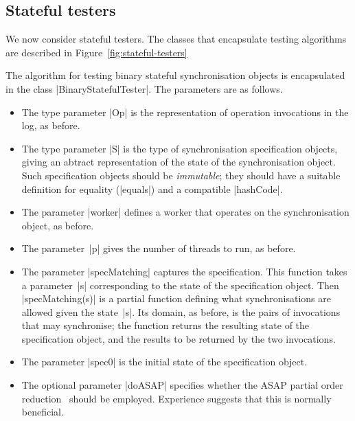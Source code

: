 \subsection{Stateful testers}

We now consider stateful testers.  The classes that encapsulate testing
algorithms are described in Figure~\ref{fig:stateful-testers}

The algorithm for testing binary stateful synchronisation objects is
encapsulated in the class |BinaryStatefulTester|.  The parameters are as
follows.
%
\begin{itemize}
\item The type parameter |Op| is the representation of operation invocations
  in the log, as before.

\item The type parameter |S| is the type of synchronisation specification
  objects, giving an abtract representation of the state of the
  synchronisation object.  Such specification objects should be
  \emph{immutable}; they should have a suitable definition for equality
  (|equals|) and a compatible |hashCode|.

\item The parameter |worker| defines a worker that operates on the
  synchronisation object, as before.

\item The parameter~|p| gives the number of threads to run, as before.

\item The parameter |specMatching| captures the specification.  This function
  takes a parameter~|s| corresponding to the state of the specification
  object.  Then |specMatching(s)| is a partial function defining what
  synchronisations are allowed given the state~|s|.  Its domain, as before, is
  the pairs of invocations that may synchronise; the function returns the
  resulting state of the specification object, and the results to be returned
  by the two invocations.

\item The parameter |spec0| is the initial state of the specification object.

\item The optional parameter |doASAP| specifies whether the ASAP partial order
  reduction~\cite{sync} should be employed.  Experience suggests that this is
  normally beneficial.
\end{itemize}


